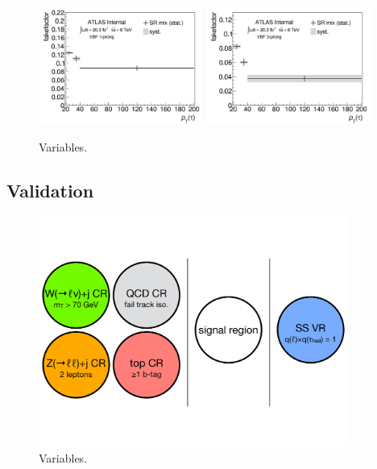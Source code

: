 \begin{figure}[tp]
  \centering
  \includegraphics[width=0.48\textwidth]{figures/backgrounds/fakefactor_8TeV_vbf_1p_mix}
  \includegraphics[width=0.48\textwidth]{figures/backgrounds/fakefactor_8TeV_vbf_3p_mix}
  \caption{Variables.}
  \label{fig:backgrounds-fakefactorsVBFmix}
\end{figure}

\clearpage

\subsection{Validation}

\begin{figure}[tp]
  \centering
  \includegraphics[width=0.90\textwidth]{figures/backgrounds/regions-cartoon}
  \caption{Variables.}
  \label{fig:backgrounds-regions}
\end{figure}

